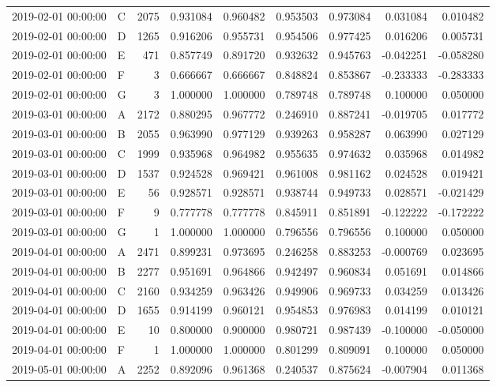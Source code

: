 \begin{tabular}{llrrrrrrr}
2019-02-01 00:00:00 & C & 2075 & 0.931084 & 0.960482 & 0.953503 & 0.973084 & 0.031084 & 0.010482 \\
2019-02-01 00:00:00 & D & 1265 & 0.916206 & 0.955731 & 0.954506 & 0.977425 & 0.016206 & 0.005731 \\
2019-02-01 00:00:00 & E & 471 & 0.857749 & 0.891720 & 0.932632 & 0.945763 & -0.042251 & -0.058280 \\
2019-02-01 00:00:00 & F & 3 & 0.666667 & 0.666667 & 0.848824 & 0.853867 & -0.233333 & -0.283333 \\
2019-02-01 00:00:00 & G & 3 & 1.000000 & 1.000000 & 0.789748 & 0.789748 & 0.100000 & 0.050000 \\
2019-03-01 00:00:00 & A & 2172 & 0.880295 & 0.967772 & 0.246910 & 0.887241 & -0.019705 & 0.017772 \\
2019-03-01 00:00:00 & B & 2055 & 0.963990 & 0.977129 & 0.939263 & 0.958287 & 0.063990 & 0.027129 \\
2019-03-01 00:00:00 & C & 1999 & 0.935968 & 0.964982 & 0.955635 & 0.974632 & 0.035968 & 0.014982 \\
2019-03-01 00:00:00 & D & 1537 & 0.924528 & 0.969421 & 0.961008 & 0.981162 & 0.024528 & 0.019421 \\
2019-03-01 00:00:00 & E & 56 & 0.928571 & 0.928571 & 0.938744 & 0.949733 & 0.028571 & -0.021429 \\
2019-03-01 00:00:00 & F & 9 & 0.777778 & 0.777778 & 0.845911 & 0.851891 & -0.122222 & -0.172222 \\
2019-03-01 00:00:00 & G & 1 & 1.000000 & 1.000000 & 0.796556 & 0.796556 & 0.100000 & 0.050000 \\
2019-04-01 00:00:00 & A & 2471 & 0.899231 & 0.973695 & 0.246258 & 0.883253 & -0.000769 & 0.023695 \\
2019-04-01 00:00:00 & B & 2277 & 0.951691 & 0.964866 & 0.942497 & 0.960834 & 0.051691 & 0.014866 \\
2019-04-01 00:00:00 & C & 2160 & 0.934259 & 0.963426 & 0.949906 & 0.969733 & 0.034259 & 0.013426 \\
2019-04-01 00:00:00 & D & 1655 & 0.914199 & 0.960121 & 0.954853 & 0.976983 & 0.014199 & 0.010121 \\
2019-04-01 00:00:00 & E & 10 & 0.800000 & 0.900000 & 0.980721 & 0.987439 & -0.100000 & -0.050000 \\
2019-04-01 00:00:00 & F & 1 & 1.000000 & 1.000000 & 0.801299 & 0.809091 & 0.100000 & 0.050000 \\
2019-05-01 00:00:00 & A & 2252 & 0.892096 & 0.961368 & 0.240537 & 0.875624 & -0.007904 & 0.011368 \\

\end{tabular}
